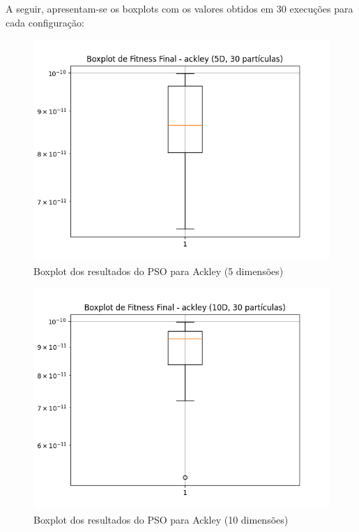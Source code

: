 \documentclass[12pt]{article}
\begin{document}
A seguir, apresentam-se os boxplots com os valores obtidos em 30 execuções para cada configuração:

\begin{figure}[H]
  \centering
  \includegraphics[width=.9\textwidth]{../graphs/boxplot_ackley_5D.png}
  \caption{Boxplot dos resultados do PSO para Ackley (5 dimensões)}
  \label{fig:boxplot_ackley_5d}
\end{figure}

\begin{figure}[H]
  \centering
  \includegraphics[width=.9\textwidth]{../graphs/boxplot_ackley_10D.png}
  \caption{Boxplot dos resultados do PSO para Ackley (10 dimensões)}
  \label{fig:boxplot_ackley_10d}
\end{figure}
\end{document}
